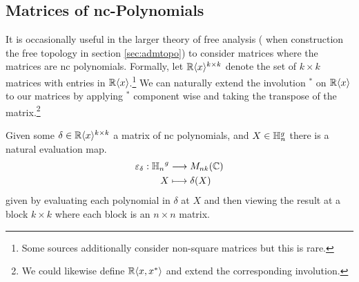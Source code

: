 \subsection{Matrices of nc-Polynomials}

It is occasionally useful in the larger theory of free analysis (\eg{} when
construction the free topology in section \ref{sec:admtopo}) to consider
matrices where the matrices are nc polynomials. Formally,
let \(\mathbb{R} \langle x \rangle ^{k\times k}\) denote the set of \(k \times k\) matrices
with entries in \(\mathbb{R} \langle x \rangle \).\footnote{Some sources additionally
  consider non-square matrices but this is rare.}
We can naturally extend the involution \(^*\) on \(\mathbb{R} \langle x \rangle \) to
our matrices by applying \(^*\) component wise and taking the transpose of the
matrix.\footnote{We could likewise define
  \(\mathbb{R} \langle x,x^* \rangle\) and extend the corresponding involution.}

Given some \(\delta \in \mathbb{R} \langle x \rangle ^{k \times k}\) a matrix of nc
polynomials, and \(X \in \mathbb{H}_n^g\) there is a natural evaluation map.
\begin{align*}
  \varepsilon_\delta: {\mathbb{H}_n}^g &\longrightarrow M_{nk}(\mathbb{C}) \\
             X &\longmapsto \delta(X)
\end{align*}
given by evaluating each polynomial in \(\delta\) at \(X\) and then viewing the
result at a block \(k \times k\) where each block is an \(n \times n\) matrix.

